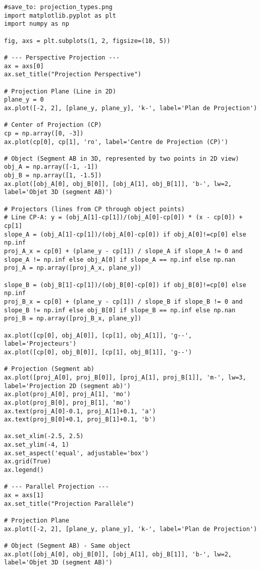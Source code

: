 \documentclass{article}
\begin{document}
\begin{verbatim}
#save_to: projection_types.png
import matplotlib.pyplot as plt
import numpy as np

fig, axs = plt.subplots(1, 2, figsize=(10, 5))

# --- Perspective Projection ---
ax = axs[0]
ax.set_title("Projection Perspective")

# Projection Plane (Line in 2D)
plane_y = 0
ax.plot([-2, 2], [plane_y, plane_y], 'k-', label='Plan de Projection')

# Center of Projection (CP)
cp = np.array([0, -3])
ax.plot(cp[0], cp[1], 'ro', label='Centre de Projection (CP)')

# Object (Segment AB in 3D, represented by two points in 2D view)
obj_A = np.array([-1, -1])
obj_B = np.array([1, -1.5])
ax.plot([obj_A[0], obj_B[0]], [obj_A[1], obj_B[1]], 'b-', lw=2, label='Objet 3D (segment AB)')

# Projectors (lines from CP through object points)
# Line CP-A: y = (obj_A[1]-cp[1])/(obj_A[0]-cp[0]) * (x - cp[0]) + cp[1]
slope_A = (obj_A[1]-cp[1])/(obj_A[0]-cp[0]) if obj_A[0]!=cp[0] else np.inf
proj_A_x = cp[0] + (plane_y - cp[1]) / slope_A if slope_A != 0 and slope_A != np.inf else obj_A[0] if slope_A == np.inf else np.nan
proj_A = np.array([proj_A_x, plane_y])

slope_B = (obj_B[1]-cp[1])/(obj_B[0]-cp[0]) if obj_B[0]!=cp[0] else np.inf
proj_B_x = cp[0] + (plane_y - cp[1]) / slope_B if slope_B != 0 and slope_B != np.inf else obj_B[0] if slope_B == np.inf else np.nan
proj_B = np.array([proj_B_x, plane_y])

ax.plot([cp[0], obj_A[0]], [cp[1], obj_A[1]], 'g--', label='Projecteurs')
ax.plot([cp[0], obj_B[0]], [cp[1], obj_B[1]], 'g--')

# Projection (Segment ab)
ax.plot([proj_A[0], proj_B[0]], [proj_A[1], proj_B[1]], 'm-', lw=3, label='Projection 2D (segment ab)')
ax.plot(proj_A[0], proj_A[1], 'mo')
ax.plot(proj_B[0], proj_B[1], 'mo')
ax.text(proj_A[0]-0.1, proj_A[1]+0.1, 'a')
ax.text(proj_B[0]+0.1, proj_B[1]+0.1, 'b')

ax.set_xlim(-2.5, 2.5)
ax.set_ylim(-4, 1)
ax.set_aspect('equal', adjustable='box')
ax.grid(True)
ax.legend()

# --- Parallel Projection ---
ax = axs[1]
ax.set_title("Projection Parallèle")

# Projection Plane
ax.plot([-2, 2], [plane_y, plane_y], 'k-', label='Plan de Projection')

# Object (Segment AB) - Same object
ax.plot([obj_A[0], obj_B[0]], [obj_A[1], obj_B[1]], 'b-', lw=2, label='Objet 3D (segment AB)')


\end{verbatim}
\end{document}
